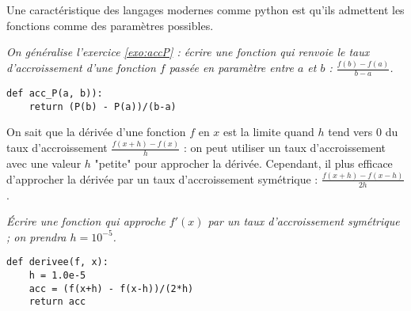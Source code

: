 \medskip

Une caractéristique des langages modernes comme python est qu'ils admettent les fonctions comme des paramètres possibles.
\begin{Exercise}[title={Taux d'accroissement général}]
\it On généralise l'exercice \ref{exo:accP} : écrire une fonction  qui renvoie le taux d'accroissement d'une fonction $f$ passée en paramètre entre $a$ et $b$ : $\displaystyle \frac{f(b) -f(a)}{b-a}$.
\end{Exercise}
\begin{Answer}
\begin{lstlisting}
def acc_P(a, b)):
    return (P(b) - P(a))/(b-a)
\end{lstlisting}
\end{Answer} 

\medskip

On sait que la dérivée d'une fonction $f$ en $x$ est la limite quand $h$ tend vers 0 du taux d'accroissement $\displaystyle \frac{f(x+h) -f(x)}h$ : on peut utiliser un taux d'accroissement avec une valeur $h$ "petite" pour approcher la dérivée. Cependant, il plus efficace d'approcher la dérivée par un taux d'accroissement symétrique : $\displaystyle \frac{f(x+h) -f(x-h)}{2h}$.
\begin{Exercise}[title={Dérivée}, label = exo:der]
\it Écrire une fonction  qui approche $f'(x)$ par un taux d'accroissement symétrique ; on prendra $h = 10^{-5}$.
\end{Exercise}
\begin{Answer}
\begin{lstlisting}
def derivee(f, x):
    h = 1.0e-5
    acc = (f(x+h) - f(x-h))/(2*h)
    return acc
\end{lstlisting}
\end{Answer} 

\medskip

